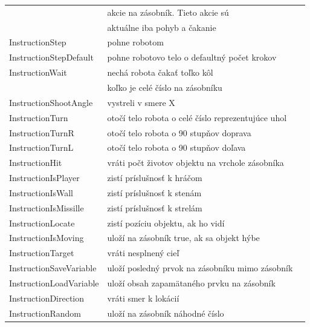 \begin{center}
\begin{longtable}{|l|l|l|}
&akcie na zásobník. Tieto akcie sú \\
&aktuálne iba pohyb a čakanie\\
InstructionStep& pohne robotom\\
InstructionStepDefault& pohne robotovo telo o defaultný počet krokov\\
InstructionWait& nechá robota čakať toľko kôl\\
& koľko je celé číslo na zásobníku\\
InstructionShootAngle& vystreli v smere X\\
InstructionTurn& otočí telo robota o celé číslo reprezentujúce uhol \\
InstructionTurnR& otočí telo robota o 90 stupňov doprava\\
InstructionTurnL& otočí telo robota o 90 stupňov doľava\\
InstructionHit& vráti počt životov objektu na vrchole zásobníka\\
InstructionIsPlayer& zistí príslušnosť k hráčom\\
InstructionIsWall& zistí príslušnosť k stenám\\
InstructionIsMissille& zistí príslušnosť k strelám\\
InstructionLocate& zistí pozíciu objektu, ak ho vidí\\
InstructionIsMoving& uloží na zásobník true, ak sa objekt hýbe\\
InstructionTarget& vráti nesplnený cieľ\\
InstructionSaveVariable& uloží posledný prvok na zásobníku mimo zásobník\\
InstructionLoadVariable& uloží obsah zapamätaného prvku na zásobník \\
InstructionDirection& vráti smer k lokácií\\
InstructionRandom& uloží na zásobník náhodné číslo\\
\hline
\end{longtable}
\end{center}
